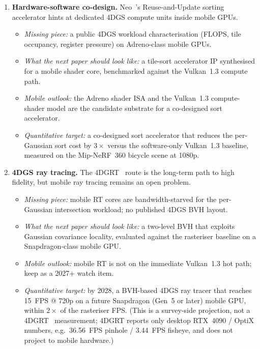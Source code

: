 \begin{enumerate}
  \item \textbf{Hardware-software co-design.} Neo~\cite{oh2025neo}'s
        Reuse-and-Update sorting accelerator hints at dedicated
        4DGS compute units inside mobile GPUs.
        \begin{itemize}
        \item \textit{Missing piece:} a public 4DGS workload
              characterisation (FLOPS, tile occupancy, register
              pressure) on Adreno-class mobile GPUs.
        \item \textit{What the next paper should look like:} a
              tile-sort accelerator IP synthesised for a mobile
              shader core, benchmarked against the
              Vulkan~1.3 compute path.
        \item \textit{Mobile outlook:} the Adreno shader ISA and
              the Vulkan~1.3 compute-shader model are the
              candidate substrate for a co-designed sort
              accelerator.
        \item \textit{Quantitative target:} a co-designed sort
              accelerator that reduces the per-Gaussian sort cost
              by $3\times$ versus the software-only Vulkan~1.3
              baseline, measured on the Mip-NeRF~360 bicycle
              scene at 1080p.
        \end{itemize}

  \item \textbf{4DGS ray tracing.} The 4DGRT~\cite{liu20254dgrt}
        route is the long-term path to high fidelity, but mobile ray
        tracing remains an open problem.
        \begin{itemize}
        \item \textit{Missing piece:} mobile RT cores are
              bandwidth-starved for the per-Gaussian intersection
              workload; no published 4DGS BVH layout.
        \item \textit{What the next paper should look like:} a
              two-level BVH that exploits Gaussian covariance
              locality, evaluated against the rasteriser baseline
              on a Snapdragon-class mobile GPU.
        \item \textit{Mobile outlook:} mobile RT is not on the
              immediate Vulkan~1.3 hot path; keep as a 2027+
              watch item.
        \item \textit{Quantitative target:} by 2028, a BVH-based
              4DGS ray tracer that reaches 15~FPS @ 720p on
              a future Snapdragon (Gen~5 or later) mobile GPU,
              within $2\times$ of the rasteriser FPS. (This
              is a survey-side projection, not a
              4DGRT~\cite{liu20254dgrt} measurement; 4DGRT
              reports only desktop RTX~4090 / OptiX numbers,
              e.g.\ 36.56~FPS pinhole / 3.44~FPS fisheye, and
              does not project to mobile hardware.)
        \end{itemize}


\end{enumerate}
